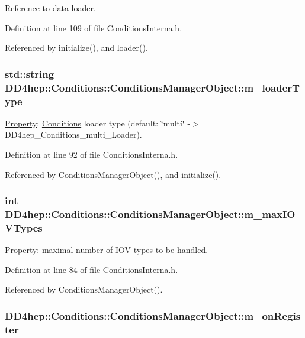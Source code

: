 Reference to data loader. 

Definition at line 109 of file ConditionsInterna.h.

Referenced by initialize(), and loader().\hypertarget{class_d_d4hep_1_1_conditions_1_1_conditions_manager_object_adc2a8ecbe9ee734901bdf11dc2e3da0e}{
\subsubsection[{m\_\-loaderType}]{\setlength{\rightskip}{0pt plus 5cm}std::string {\bf DD4hep::Conditions::ConditionsManagerObject::m\_\-loaderType}}}
\label{class_d_d4hep_1_1_conditions_1_1_conditions_manager_object_adc2a8ecbe9ee734901bdf11dc2e3da0e}


\hyperlink{class_d_d4hep_1_1_property}{Property}: \hyperlink{namespace_d_d4hep_1_1_conditions}{Conditions} loader type (default: \char`\"{}multi\char`\"{} -\/$>$ DD4hep\_\-Conditions\_\-multi\_\-Loader). 

Definition at line 92 of file ConditionsInterna.h.

Referenced by ConditionsManagerObject(), and initialize().\hypertarget{class_d_d4hep_1_1_conditions_1_1_conditions_manager_object_a8367e7cb7b833dee436e0eacb6c37a87}{
\subsubsection[{m\_\-maxIOVTypes}]{\setlength{\rightskip}{0pt plus 5cm}int {\bf DD4hep::Conditions::ConditionsManagerObject::m\_\-maxIOVTypes}}}
\label{class_d_d4hep_1_1_conditions_1_1_conditions_manager_object_a8367e7cb7b833dee436e0eacb6c37a87}


\hyperlink{class_d_d4hep_1_1_property}{Property}: maximal number of \hyperlink{class_d_d4hep_1_1_i_o_v}{IOV} types to be handled. 

Definition at line 84 of file ConditionsInterna.h.

Referenced by ConditionsManagerObject().\hypertarget{class_d_d4hep_1_1_conditions_1_1_conditions_manager_object_a28a1e3f34a87dcd305b0f71bb92f297f}{
\subsubsection[{m\_\-onRegister}]{ {\bf DD4hep::Conditions::ConditionsManagerObject::m\_\-onRegister}}}
\label{class_d_d4hep_1_1_conditions_1_1_conditions_manager_object_a28a1e3f34a87dcd305b0f71bb92f297f}


